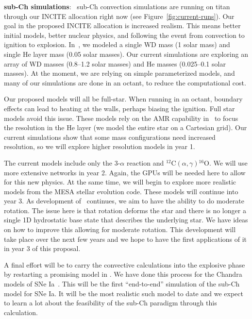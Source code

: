 \documentclass[11pt,letterpaper,english]{article}
\begin{document}
{\bf sub-Ch simulations}: \maestro\ sub-Ch convection simulations are
running on titan through our INCITE allocation right now (see
Figure~\ref{fig:current-runs}).  Our goal in the proposed INCITE
allocation is increased realism.  This means better initial models,
better nuclear physics, and following the event from convection to
ignition to explosion.  In~\cite{Zin13}, we modeled a single WD mass
(1 solar mass) and single He layer mass (0.05 solar masses).  Our 
current simulations are exploring an array of WD masses (0.8--1.2 solar masses)
and He masses (0.025--0.1 solar masses).  At the moment, we are relying
on simple parameterized models, and many of our simulations are done in an
octant, to reduce the computational cost.

Our proposed models will all be full-star.  When running in an octant,
boundary effects can lead to heating at the walls, perhaps biasing the
ignition.  Full star models avoid this issue.  These models rely on the AMR
capability in \maestro\ to focus the resolution in the He layer (we
model the entire star on a Cartesian grid).  Our current simulations
show that some mass configurations need increased resolution, so we will
explore higher resolution models in year 1. 

The current models include only the 3-$\alpha$ reaction and
$^{12}\mathrm{C} (\alpha,\gamma){}^{16}\mathrm{O}$.  We will use more
extensive networks in year 2.  Again, the GPUs will be needed here to allow
for this new physics.  At the same time, we will begin to
explore more realistic models from the MESA stellar evolution code.
These models will continue into year 3.  As development of \maestro\
continues, we aim to have the ability to do moderate rotation.
The issue here is that rotation deforms the star and there is no
longer a single 1D hydrostatic base state that describes the underlying
star.  We have ideas on how to improve this allowing for moderate rotation.
This development will take place over the next few years and we hope to
have the first applications of it in year 3 of this proposal.

A final effort will be to carry the convective calculations into the
explosive phase by restarting a promising model in \castro.  We have
done this process for the Chandra models of SNe Ia~\cite{Mal14}.  This
will be the first ``end-to-end'' simulation of the sub-Ch model for
SNe Ia.  It will be the most realistic such model to date and we expect
to learn a lot about the feasibility of the sub-Ch paradigm through
this calculation.
\end{document}
